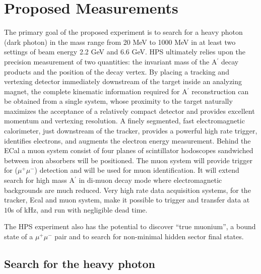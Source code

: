 \section{Proposed Measurements}


The primary goal of the proposed experiment is to search for a heavy photon (dark photon) in the mass range from 20 MeV to 1000 MeV in at least two settings of beam energy 2.2 GeV and 6.6 GeV. 
HPS  ultimately relies upon the precision measurement of two quantities: the invariant mass of the A$^\prime$ decay products and the position of the decay vertex. By placing a tracking and vertexing detector immediately downstream of the target inside an analyzing magnet, the complete kinematic information required for A$^\prime$ reconstruction can be obtained from a single system, whose proximity to the target naturally maximizes the acceptance of a relatively compact detector and provides excellent momentum and vertexing resolution. A finely segmented, fast electromagnetic calorimeter, just downstream of the tracker,  provides a powerful high rate trigger, identifies electrons, and augments  the electron energy measurement. Behind the ECal a muon system consist of four planes of scintillator hodoscopes sandwiched between iron absorbers will be positioned. The muon system will provide trigger for ($\mu^+\mu^-$) detection and will be used for muon identification. It will extend search for high mass A$^\prime$ in di-muon decay mode where electromagnetic backgrounds are much reduced. Very high rate data acquisition systems, for the tracker, Ecal and muon system, make it possible to trigger and transfer data at $10$s of kHz, and run with negligible dead time.

The HPS experiment also has the potential to discover ``true muonium'', a bound state of a $\mu^+ \mu^-$ pair and to search for non-minimal hidden sector final states.  

\subsection{Search for the heavy photon}
\def \ap {A^\prime}
\def \map {m_{A^\prime}}
\def \thap {\theta_{A^\prime}}
\label{sec:apsignal}


